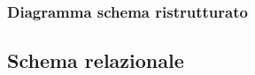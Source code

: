 \documentclass[10pt]{article}
\begin{document}
\subsubsection{Diagramma schema ristrutturato}
\begin{figure}[h]
\end{figure}

\subsection{Schema relazionale}
\end{document}
